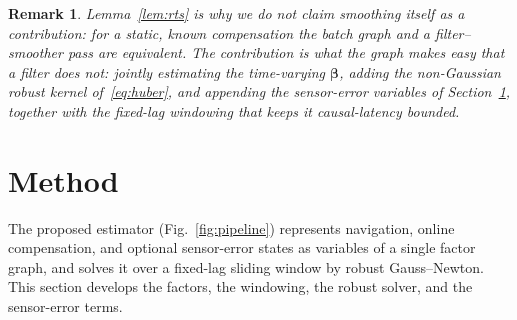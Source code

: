 \documentclass{IEEEtaes}
\newtheorem{remark}{Remark}
\begin{document}
\begin{remark}
Lemma~\ref{lem:rts} is why we do not claim smoothing itself as a contribution: for
a static, known compensation the batch graph and a filter--smoother pass are
equivalent. The contribution is what the graph makes easy that a filter does
not: jointly estimating the time-varying $\boldsymbol{\beta}$, adding the
non-Gaussian robust kernel of~\eqref{eq:huber}, and appending the sensor-error
variables of Section~\ref{sec:method}, together with the fixed-lag windowing that
keeps it causal-latency bounded.
\end{remark}

\section{Method}\label{sec:method}
The proposed estimator (Fig.~\ref{fig:pipeline}) represents navigation, online
compensation, and optional sensor-error states as variables of a single factor
graph, and solves it over a fixed-lag sliding window by robust Gauss--Newton. This
section develops the factors, the windowing, the robust solver, and the
sensor-error terms.
\end{document}

